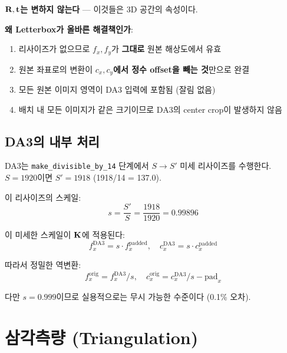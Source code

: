 \documentclass[11pt, a4paper]{report}
\theoremstyle{definition}
\theoremstyle{remark}
\begin{document}
\textbf{$\mathbf{R}, \mathbf{t}$는 변하지 않는다} --- 이것들은 3D 공간의 속성이다.

\begin{keyidea}
\textbf{왜 Letterbox가 올바른 해결책인가}:
\begin{enumerate}[nosep]
  \item 리사이즈가 없으므로 $f_x, f_y$가 \textbf{그대로} 원본 해상도에서 유효
  \item 원본 좌표로의 변환이 \textbf{$c_x, c_y$에서 정수 offset을 빼는 것}만으로 완결
  \item 모든 원본 이미지 영역이 DA3 입력에 포함됨 (잘림 없음)
  \item 배치 내 모든 이미지가 같은 크기이므로 DA3의 center crop이 발생하지 않음
\end{enumerate}
\end{keyidea}


\section{DA3의 내부 처리}

\begin{warningbox}
DA3는 \texttt{make\_divisible\_by\_14} 단계에서 $S \rightarrow S'$ 미세 리사이즈를 수행한다.
$S = 1920$이면 $S' = 1918$ (1918/14 = 137.0).

이 리사이즈의 스케일:
\begin{equation}
s = \frac{S'}{S} = \frac{1918}{1920} = 0.99896
\end{equation}

이 미세한 스케일이 $\mathbf{K}$에 적용된다:
\begin{equation}
f_x^{\text{DA3}} = s \cdot f_x^{\text{padded}}, \quad c_x^{\text{DA3}} = s \cdot c_x^{\text{padded}}
\end{equation}

따라서 정밀한 역변환:
\begin{equation}
f_x^{\text{orig}} = f_x^{\text{DA3}} / s, \quad c_x^{\text{orig}} = c_x^{\text{DA3}} / s - \text{pad}_x
\end{equation}

다만 $s = 0.999$이므로 실용적으로는 무시 가능한 수준이다 (0.1\% 오차).
\end{warningbox}


\chapter{삼각측량 (Triangulation)}
\label{ch:triangulation}
\end{document}
